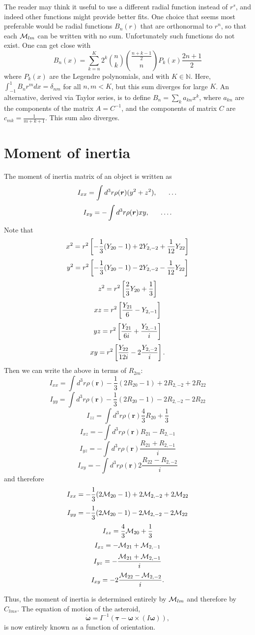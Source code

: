 \documentclass[aps,twocolumn,secnumarabic,balancelastpage,amsmath,amssymb,nofootinbib,floatfix]{revtex4-1}
\begin{document}
The reader may think it useful to use a different radial function instead of $r^s$, and indeed other functions might provide better fits. One choice that seems most preferable would be radial functions $B_{n}(r)$ that are orthonormal to $r^n$, so that each $\mathcal{M}_{lm}$ can be written with no sum. Unfortunately such functions do not exist. One can get close with
$$B_n(x)=\sum_{k=n}^K 2^k \binom{n}{k} \binom{\frac{n+k-1}{2}}{n}P_k(x)\frac{2n + 1}{2}$$
where $P_k(x)$ are the Legendre polynomials, and with $K \in \mathbb{N}$. Here, $\int_{-1}^1 B_n r^m dx = \delta_{nm}$ for all $n, m < K$, but this sum diverges for large $K$. An alternative, derived via Taylor series, is to define $B_n = \sum_k a_{kn}x^k$, where $a_{kn}$ are the components of the matrix $A=C^{-1}$, and the components of matrix $C$ are $c_{mk}=\frac{1}{m+k+1}$. This sum also diverges.


\section{Moment of inertia}
The moment of inertia matrix of an object is written as
$$I_{xx}=\int d^3 r \rho(\bm r) (y^2 + z^2), \indent \dots$$
$$I_{xy}=-\int d^3 r \rho(\bm r) xy, \indent \dots.$$
Note that
$$x^2=r^2\left[ -\frac{1}{3}(Y_{20}-1)+2Y_{2,-2}+\frac{1}{12}Y_{22} \right]$$
$$y^2=r^2\left[ -\frac{1}{3}(Y_{20}-1)-2Y_{2,-2}-\frac{1}{12}Y_{22} \right]$$
$$z^2=r^2\left[ \frac{2}{3}Y_{20}+\frac{1}{3} \right]$$
$$xz=r^2\left[ \frac{Y_{21}}{6}-Y_{2,-1} \right]$$
$$yz=r^2\left[ \frac{Y_{21}}{6i}+\frac{Y_{2,-1}}{i} \right]$$
$$xy=r^2\left[ \frac{Y_{22}}{12i}-2\frac{Y_{2,-2}}{i} \right].$$
Then we can write the above in terms of $R_{2m}$:
$$I_{xx}=\int d^3r \rho(\bm r)-\frac{1}{3}(2R_{20}-1)+2R_{2,-2}+2R_{22}$$
$$I_{yy}=\int d^3r \rho(\bm r)-\frac{1}{3}(2R_{20}-1)-2R_{2,-2}-2R_{22}$$
$$I_{zz}=\int d^3r \rho(\bm r)\frac{4}{3}R_{20}+\frac{1}{3}$$
$$I_{xz}=-\int d^3r \rho(\bm r)R_{21}-R_{2,-1}$$
$$I_{yz}=-\int d^3r \rho(\bm r)\frac{R_{21}+R_{2,-1}}{i}$$
$$I_{xy}=-\int d^3r \rho(\bm r)2\frac{R_{22}-R_{2,-2}}{i}$$
and therefore
$$I_{xx}=-\frac{1}{3}(2\mathcal{M}_{20}-1)+2\mathcal{M}_{2,-2}+2\mathcal{M}_{22}$$
$$I_{yy}=-\frac{1}{3}(2\mathcal{M}_{20}-1)-2\mathcal{M}_{2,-2}-2\mathcal{M}_{22}$$
$$I_{zz}=\frac{4}{3}\mathcal{M}_{20}+\frac{1}{3}$$
$$I_{xz}=-\mathcal{M}_{21}+\mathcal{M}_{2,-1}$$
$$I_{yz}=-\frac{\mathcal{M}_{21}+\mathcal{M}_{2,-1}}{i}$$
$$I_{xy}=-2\frac{\mathcal{M}_{22}-\mathcal{M}_{2,-2}}{i}.$$

Thus, the moment of inertia is determined entirely by $\mathcal{M}_{lm}$ and therefore by $C_{lms}$. The equation of motion of the asteroid,
$$\dot{\bm \omega} = I^{-1}(\bm \tau - \bm\omega \times (I \bm\omega)),$$
is now entirely known as a function of orientation.
\end{document}
